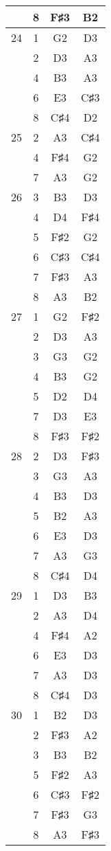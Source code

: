 \documentclass{article}
\begin{document}
\begin{longtable}{|c|c|c|c|}
  & 8 & F♯3 & B2 \\ 
\hline
24 & 1 & G2 & D3 \\ 
  & 2 & D3 & A3 \\ 
  & 4 & B3 & A3 \\ 
  & 6 & E3 & C♯3 \\ 
  & 8 & C♯4 & D2 \\ 
\hline
25 & 2 & A3 & C♯4 \\ 
  & 4 & F♯4 & G2 \\ 
  & 7 & A3 & G2 \\ 
\hline
26 & 3 & B3 & D3 \\ 
  & 4 & D4 & F♯4 \\ 
  & 5 & F♯2 & G2 \\ 
  & 6 & C♯3 & C♯4 \\ 
  & 7 & F♯3 & A3 \\ 
  & 8 & A3 & B2 \\ 
\hline
27 & 1 & G2 & F♯2 \\ 
  & 2 & D3 & A3 \\ 
  & 3 & G3 & G2 \\ 
  & 4 & B3 & G2 \\ 
  & 5 & D2 & D4 \\ 
  & 7 & D3 & E3 \\ 
  & 8 & F♯3 & F♯2 \\ 
\hline
28 & 2 & D3 & F♯3 \\ 
  & 3 & G3 & A3 \\ 
  & 4 & B3 & D3 \\ 
  & 5 & B2 & A3 \\ 
  & 6 & E3 & D3 \\ 
  & 7 & A3 & G3 \\ 
  & 8 & C♯4 & D4 \\ 
\hline
29 & 1 & D3 & B3 \\ 
  & 2 & A3 & D4 \\ 
  & 4 & F♯4 & A2 \\ 
  & 6 & E3 & D3 \\ 
  & 7 & A3 & D3 \\ 
  & 8 & C♯4 & D3 \\ 
\hline
30 & 1 & B2 & D3 \\ 
  & 2 & F♯3 & A2 \\ 
  & 3 & B3 & B2 \\ 
  & 5 & F♯2 & A3 \\ 
  & 6 & C♯3 & F♯2 \\ 
  & 7 & F♯3 & G3 \\ 
  & 8 & A3 & F♯3 \\ 
\hline

\end{longtable}
\end{document}

